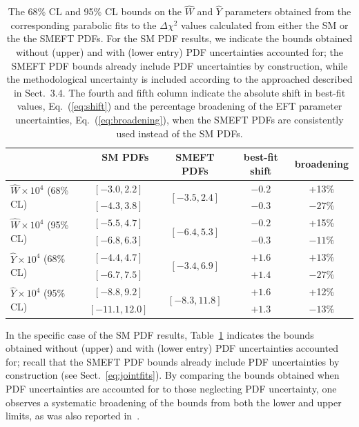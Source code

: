 \documentclass[withindex,glossary]{cam-thesis}
\begin{document}
\begin{table}[t]
  \renewcommand{\arraystretch}{1.40}
  \centering
  \begin{tabular}{l|c|c|c|c}
    & $\quad$ SM PDFs $\quad$  & SMEFT PDFs  & best-fit shift  & broadening  \\
    \toprule
    \multirow{2}{*}{$\hat{W}\times 10^4$ (68\% CL)} & $[-3.0, 2.2] $ & \multirow{2}{*}{$[-3.5, 2.4]$}  & $-0.2$    &+13\%\\
    & $[-4.3, 3.8] $ &   &  $-0.3$   & $-27\%$ \\
    \midrule
    \multirow{2}{*}{$\hat{W}\times 10^4$ (95\% CL)} & $[-5.5, 4.7] $ &  \multirow{2}{*}{ $[-6.4, 5.3] $} & $-0.2$  & +15\%\\
     &   $[-6.8, 6.3] $   &  & $-0.3$      &$-11\%$ \\
    \midrule
    \multirow{2}{*}{$\hat{Y}\times 10^4$ (68\% CL)} & $[-4.4, 4.7] $ &  \multirow{2}{*}{$[-3.4, 6.9]$} & $+1.6$ &  $+13\%$\\
       & $[-6.7, 7.5] $ &   & $+1.4$ & $-27\%$ \\
    \midrule
    \multirow{2}{*}{$\hat{Y}\times 10^4$ (95\% CL)} & $[-8.8, 9.2] $ &  \multirow{2}{*}{$[-8.3, 11.8]$} & $+1.6$ & +12\% \\
     & $[-11.1, 12.0] $ &   & $+1.3$ & $-13\%$ \\
    \bottomrule
  \end{tabular}
  \caption{\label{tab:bound1w} \small The 68\% CL and 95\% CL bounds on the $\hat{W}$ and $\hat{Y}$
    parameters obtained from the  corresponding parabolic fits to
    the $\Delta\chi^2$ values calculated from  either the SM or the the SMEFT PDFs.
    For the SM PDF results, we indicate the bounds obtained without (upper)
    and with (lower entry) PDF uncertainties accounted for; the SMEFT PDF
    bounds already include  PDF uncertainties by construction, while
    the methodological uncertainty is included according to the
    approached described in Sect.~3.4. 
    The fourth and fifth column indicate the absolute shift in best-fit values,
    Eq.~(\ref{eq:shift})
    and the percentage broadening of the EFT parameter uncertainties, Eq.~(\ref{eq:broadening}),
    when the SMEFT PDFs
    are consistently used instead of the SM PDFs.
}
\end{table}

In the specific case of the SM PDF results,
Table~\ref{tab:bound1w} indicates
the bounds obtained without (upper) and with (lower entry) PDF uncertainties accounted for;
recall that the SMEFT PDF bounds already include PDF uncertainties by construction
(see Sect.~\ref{eq:jointfits}).
By comparing the bounds obtained when PDF uncertainties are accounted for to
those neglecting PDF uncertainty, one observes a systematic broadening of the
bounds from both the lower and upper limits, as was also reported in~\cite{Carrazza:2019sec}.
\end{document}
